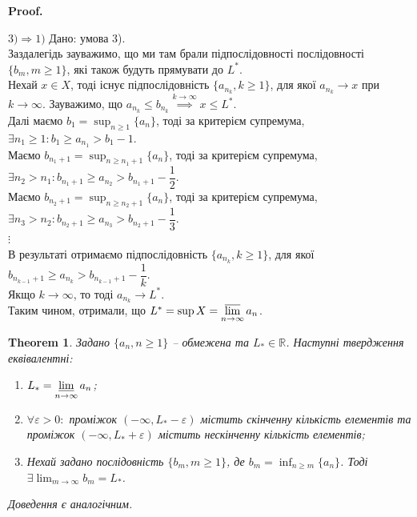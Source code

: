 \documentclass[a4paper, 14pt]{article}
\makeatletter
\def\qed{$\blacksquare$}
\theoremstyle{theoremdd}
\newtheorem{theorem}{Theorem}[subsection]
\theoremstyle{theoremdd}
\theoremstyle{theoremdd}
\theoremstyle{theoremdd}
\theoremstyle{theoremdd}
\theoremstyle{theoremdd}
\theoremstyle{theoremdd}
\theoremstyle{theoremdd}
\renewenvironment{proof}[1][Proof.\\]{\par
\pushQED{\hfill \qed}%
\normalfont \topsep6\p@\@plus6\p@\relax
\trivlist
\item\relax
{\bfseries
#1\@addpunct{.}}\hspace\labelsep\ignorespaces
}{%
\popQED\endtrivlist\@endpefalse
}
\makeatother
\begin{document}
\begin{proof}
	$\boxed{3) \Rightarrow 1)}$ Дано: умова 3).\\

	Заздалегідь зауважимо, що ми там брали підпослідовності послідовності $\{b_m, m \geq 1\}$, які також будуть прямувати до $L^*$.\\
	Нехай $x \in X$, тоді існує підпослідовність $\{a_{n_k}, k \geq 1\}$, для якої $a_{n_k} \to x$ при $k \to \infty$. Зауважимо, що $a_{n_k} \leq b_{{n_k}} \overset{k \to \infty}{\implies} x \leq L^*$.\\
	Далі маємо $b_1 = \displaystyle\sup_{n \geq 1} \{a_n\}$, тоді за критерієм супремума, $\exists n_1 \geq 1: b_1 \geq a_{n_1} > b_1-1$.\\
	Маємо $b_{n_1+1} = \displaystyle\sup_{n \geq n_1+1} \{a_n\}$, тоді за критерієм супремума, $\exists n_2 > n_1: b_{n_1+1} \geq a_{n_2} > b_{n_1+1} - \dfrac{1}{2}$.\\
	Маємо $b_{n_2+1} = \displaystyle\sup_{n \geq n_2+1} \{a_n\}$, тоді за критерієм супремума, $\exists n_3 > n_2: b_{n_2+1} \geq a_{n_3} > b_{n_2+1} - \dfrac{1}{3}$.\\
	$\vdots$\\
	В результаті отримаємо підпослідовність $\{a_{n_k}, k \geq 1\}$, для якої $b_{n_{k-1}+1} \geq a_{n_k} > b_{n_{k-1}+1} - \dfrac{1}{k}$.\\
	Якщо $k \to \infty$, то тоді $a_{n_k} \to L^*$.\\
	Таким чином, отримали, що $L^* = \sup X = \displaystyle\varlimsup_{n \to \infty} a_n$.
	\end{proof}
	
	\begin{theorem}
	Задано $\{a_n, n \geq 1\}$ -- обмежена та $L_* \in \mathbb{R}$. Наступні твердження еквівалентні:\\
	\begin{enumerate}[nosep,wide=0pt,label={\arabic*)}]
	\item $L_* = \displaystyle \varliminf_{n \to \infty} a_n$;
	\item $\forall \varepsilon > 0:$ проміжок $(-\infty,  L_*-\varepsilon)$ містить скінченну кількість елементів та проміжок $(-\infty,  L_*+\varepsilon)$ містить нескінченну кількість елементів;
	\item Нехай задано послідовність $\{b_m, m \geq 1\}$, де $b_m = \displaystyle \inf_{n \geq m} \{a_n\}$. Тоді $\exists \displaystyle \lim_{m \to \infty} b_m = L_*$.
	\end{enumerate}
	\textit{Доведення є аналогічним.}
	\end{theorem}
	
\end{document}
